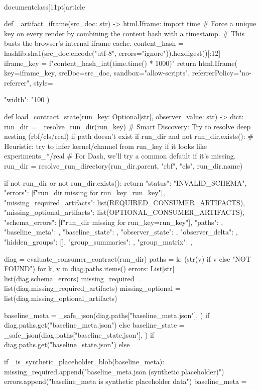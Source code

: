 \\documentclass[11pt]{article}
\begin{document}
\begin{CodeBlock}
def _artifact_iframe(src_doc: str) -> html.Iframe:
    import time
    # Force a unique key on every render by combining the content hash with a timestamp.
    # This busts the browser's internal iframe cache.
    content_hash = hashlib.sha1(src_doc.encode("utf-8", errors="ignore")).hexdigest()[:12]
    iframe_key = f"{content_hash}_{int(time.time() * 1000)}"
    return html.Iframe(
        key=iframe_key,
        srcDoc=src_doc,
        sandbox="allow-scripts",
        referrerPolicy="no-referrer",
        style={"width": "100%
    )


def load_contract_state(run_key: Optional[str], observer_value: str) -> dict:
    run_dir = _resolve_run_dir(run_key)
    # Smart Discovery: Try to resolve deep nesting (rbf/cls/real) if path doesn't exist
    if run_dir and not run_dir.exists():
        # Heuristic: try to infer kernel/channel from run_key if it looks like experiments_*/real
        # For Dash, we'll try a common default if it's missing.
        run_dir = resolve_run_directory(run_dir.parent, "rbf", "cls", run_dir.name)

    if not run_dir or not run_dir.exists():
        return {
            "status": "INVALID_SCHEMA",
            "errors": [f"run_dir missing for run_key={run_key}"],
            "missing_required_artifacts": list(REQUIRED_CONSUMER_ARTIFACTS),
            "missing_optional_artifacts": list(OPTIONAL_CONSUMER_ARTIFACTS),
            "schema_errors": [f"run_dir missing for run_key={run_key}"],
            "paths": {},
            "baseline_meta": {},
            "baseline_state": {},
            "observer_state": {},
            "observer_delta": {},
            "hidden_groups": [],
            "group_summaries": {},
            "group_matrix": {},
        }

    diag = evaluate_consumer_contract(run_dir)
    paths = {k: (str(v) if v else "NOT FOUND") for k, v in diag.paths.items()}
    errors: List[str] = list(diag.schema_errors)
    missing_required = list(diag.missing_required_artifacts)
    missing_optional = list(diag.missing_optional_artifacts)

    baseline_meta = _safe_json(diag.paths["baseline_meta.json"], {}) if diag.paths.get("baseline_meta.json") else {}
    baseline_state = _safe_json(diag.paths["baseline_state.json"], {}) if diag.paths.get("baseline_state.json") else {}

    if _is_synthetic_placeholder_blob(baseline_meta):
        missing_required.append("baseline_meta.json (synthetic placeholder)")
        errors.append("baseline_meta is synthetic placeholder data")
        baseline_meta = {}

}
\end{CodeBlock}
\end{document}
